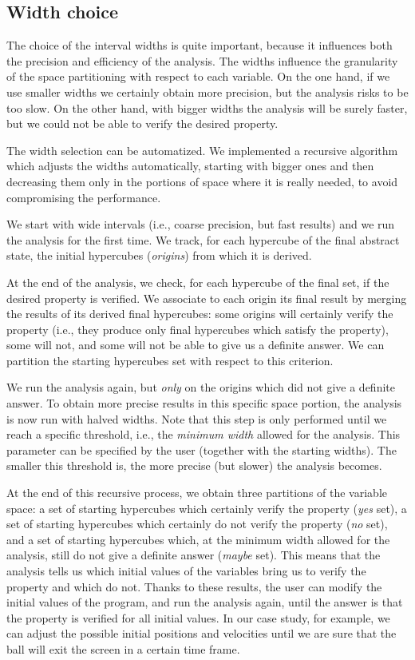 \subsection{Width choice} \label{sec:widths}
The choice of the interval widths is quite important, because it influences both the precision and efficiency of the analysis. The widths influence the granularity of the space partitioning with respect to each variable. On the one hand, if we use smaller widths we certainly obtain more precision, but the analysis risks to be too slow. On the other hand, with bigger widths the analysis will be surely faster, but we could not be able to verify the desired property. 

The width selection can be automatized. We implemented a recursive algorithm which adjusts the widths automatically, starting with bigger ones and then decreasing them only in the portions of space where it is really needed, to avoid compromising the performance.

We start with wide intervals (i.e., coarse precision, but fast results) and we run the analysis for the first time. We track, for each hypercube of the final abstract state, the initial hypercubes (\textit{origins}) from which it is derived.

At the end of the analysis, we check, for each hypercube of the final set, if the desired property is verified. We associate to each origin its final result by merging the results of its derived final hypercubes: some origins will certainly verify the property (i.e., they produce only final hypercubes which satisfy the property), some will not, and some will not be able to give us a definite answer. We can partition the starting hypercubes set with respect to this criterion.

We run the analysis again, but \emph{only} on the origins which did not give a definite answer. To obtain more precise results in this specific space portion, the analysis is now run with halved widths. Note that this step is only performed until we reach a specific threshold, i.e., the \textit{minimum width} allowed for the analysis. This parameter can be specified by the user (together with the starting widths). The smaller this threshold is, the more precise (but slower) the analysis becomes.


At the end of this recursive process, we obtain three partitions of the variable space: a set of starting hypercubes which certainly verify the property (\emph{yes} set), a set of starting hypercubes which certainly do not verify the property (\emph{no} set), and a set of starting hypercubes which, at the minimum width allowed for the analysis, still do not give a definite answer (\emph{maybe} set). This means that the analysis tells us which initial values of the variables bring us to verify the property and which do not. Thanks to these results, the user can modify the initial values of the program, and run the analysis again, until the answer is that the property is verified for all initial values. In our case study, for example, we can adjust the possible initial positions and velocities until we are sure that the ball will exit the screen in a certain time frame. 

